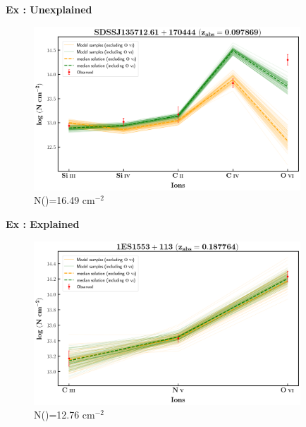 \documentclass[aspectratio=169]{beamer}
\newcommand\ion[2]{\text{#1\,\textsc{\lowercase{#2}}}}
\begin{document}
\begin{frame}[noframenumbering]{\textbf{Ex : Unexplained}}

\begin{figure}[!htbp]
  \centering
  \includegraphics[width=10cm]{Figures/s135712-z=0.097869-compII.png}
  \vspace*{-1mm}
  \caption{N(\ion{H}{i})=16.49 cm$^{-2}$}
\end{figure}  

\end{frame}


\begin{frame}[noframenumbering]{\textbf{Ex : Explained}}

\begin{figure}[!htbp]
  \centering
  \includegraphics[width=10cm]{Figures/1es1553-z=0.187764-compI.png}
  \vspace*{-1mm}
  \caption{N(\ion{H}{i})=12.76 cm$^{-2}$}
\end{figure}  

\end{frame}
\end{document}
